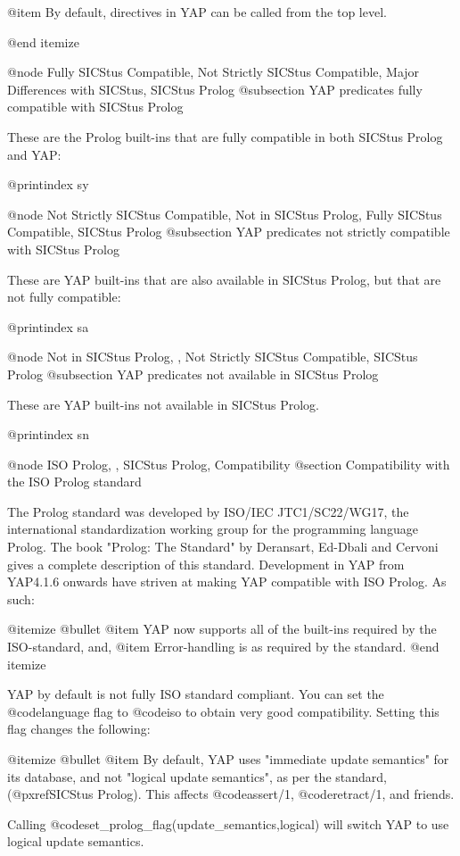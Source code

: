 @item By default, directives in YAP can be called from the top level.

@end itemize

@node Fully SICStus Compatible, Not Strictly SICStus Compatible, Major Differences with SICStus, SICStus Prolog
@subsection YAP predicates fully compatible with SICStus Prolog

These are the Prolog built-ins that are fully compatible in both SICStus
Prolog and YAP:

@printindex sy

@node Not Strictly SICStus Compatible, Not in SICStus Prolog, Fully SICStus Compatible, SICStus Prolog
@subsection YAP predicates not strictly compatible with SICStus Prolog

These are YAP built-ins that are also available in SICStus Prolog, but
that are not fully compatible:

@printindex sa

@node Not in SICStus Prolog, , Not Strictly SICStus Compatible, SICStus Prolog
@subsection YAP predicates not available in SICStus Prolog

These are YAP built-ins not available in SICStus Prolog.

@printindex sn


@node ISO Prolog, , SICStus Prolog, Compatibility
@section Compatibility with the ISO Prolog standard

The Prolog standard was developed by ISO/IEC JTC1/SC22/WG17, the
international standardization working group for the programming language
Prolog. The book "Prolog: The Standard" by Deransart, Ed-Dbali and
Cervoni gives a complete description of this standard. Development in
YAP from YAP4.1.6 onwards have striven at making YAP
compatible with ISO Prolog. As such:

@itemize @bullet
@item   YAP now supports all of the built-ins required by the
ISO-standard, and,
@item   Error-handling is as required by the standard.
@end itemize

YAP by default is not fully ISO standard compliant. You can set the 
@code{language} flag to @code{iso} to obtain very good
compatibility. Setting this flag changes the following:

@itemize @bullet
@item By default, YAP uses "immediate update semantics" for its
database, and not "logical update semantics", as per the standard,
(@pxref{SICStus Prolog}). This affects @code{assert/1},
@code{retract/1}, and friends.

Calling @code{set_prolog_flag(update_semantics,logical)} will switch
YAP to use logical update semantics.

